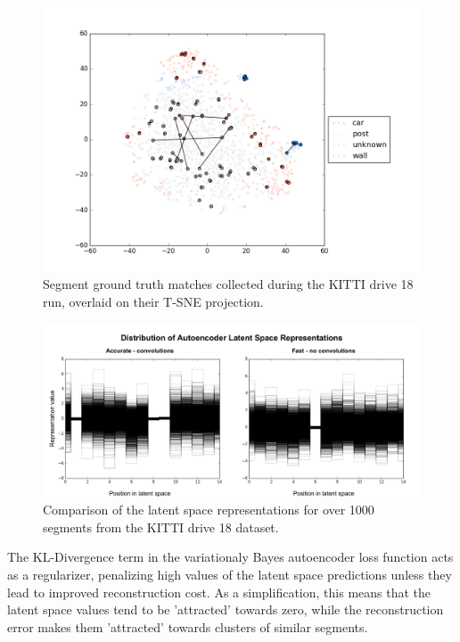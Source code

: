 \begin{figure}
  \centering
  \includegraphics[width=5.2in]{images/t-sne_matches.png}
  \caption{Segment ground truth matches collected during the KITTI drive 18 run, overlaid on their T-SNE projection.}
  \label{fig:fastvaccurate-features}
\end{figure}

\begin{figure}
  \centering
  \includegraphics[width=5.2in]{images/fastvaccuratefeatures.pdf}
  \caption{Comparison of the latent space representations for over 1000 segments from the KITTI drive 18 dataset.}
  \label{fig:fastvaccurate-features}
\end{figure}

The KL-Divergence term in the variationaly Bayes autoencoder loss function acts as a regularizer, penalizing high values of the latent space predictions unless they lead to improved reconstruction cost. As a simplification, this means that the latent space values tend to be 'attracted' towards zero, while the reconstruction error makes them 'attracted' towards clusters of similar segments.\\

